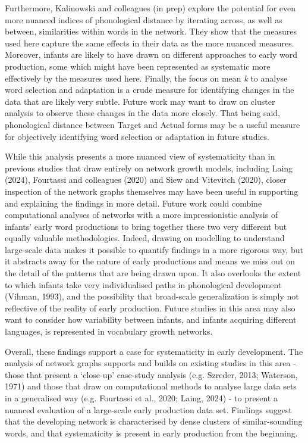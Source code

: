 \documentclass[
  man]{apa6}
\begin{document}
Furthermore, Kalinowski and colleagues (in prep) explore the potential for even more nuanced indices of phonological distance by iterating across, as well as between, similarities within words in the network. They show that the measures used here capture the same effects in their data as the more nuanced measures. Moreover, infants are likely to have drawn on different approaches to early word production, some which might have been represented as systematic more effectively by the measures used here. Finally, the focus on mean \emph{k} to analyse word selection and adaptation is a crude measure for identifying changes in the data that are likely very subtle. Future work may want to draw on cluster analysis to observe these changes in the data more closely. That being said, phonological distance between Target and Actual forms may be a useful measure for objectively identifying word selection or adaptation in future studies.

While this analysis presents a more nuanced view of systematicity than in previous studies that draw entirely on network growth models, including Laing (2024), Fourtassi and colleagues (2020) and Siew and Vitevitch (2020), closer inspection of the network graphs themselves may have been useful in supporting and explaining the findings in more detail. Future work could combine computational analyses of networks with a more impressionistic analysis of infants' early word productions to bring together these two very different but equally valuable methodologies. Indeed, drawing on modelling to understand large-scale data makes it possible to quantify findings in a more rigorous way, but it abstracts away for the nature of early productions and means we miss out on the detail of the patterns that are being drawn upon. It also overlooks the extent to which infants take very individualised paths in phonological development (Vihman, 1993), and the possibility that broad-scale generalization is simply not reflective of the reality of early production. Future studies in this area may also want to consider how variability between infants, and infants acquiring different languages, is represented in vocabulary growth networks.

Overall, these findings support a case for systematicity in early development. The analysis of network graphs supports and builds on existing studies in this area - those that present a `close-up' case-study analysis (e.g. Szreder, 2013; Waterson, 1971) and those that draw on computational methods to analyse large data sets in a generalised way (e.g. Fourtassi et al., 2020; Laing, 2024) - to present a nuanced evaluation of a large-scale early production data set. Findings suggest that the developing network is characterised by dense clusters of similar-sounding words, and that systematicity is present in early production from the beginning.
\newpage
\end{document}
